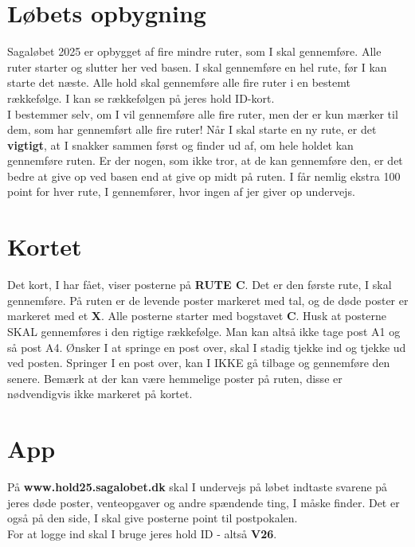 \section{Løbets opbygning}
Sagaløbet 2025 er opbygget af fire mindre ruter, som I skal gennemføre. Alle ruter starter og slutter her ved basen. I skal gennemføre en hel rute, før I kan starte det næste. Alle hold skal gennemføre alle fire ruter i en bestemt rækkefølge. I kan se rækkefølgen på jeres hold ID-kort.\\\newline
I bestemmer selv, om I vil gennemføre alle fire ruter, men der er kun mærker til dem, som har gennemført alle fire ruter! Når I skal starte en ny rute, er det \textbf{vigtigt}, at I snakker sammen først og finder ud af, om hele holdet kan gennemføre ruten. Er der nogen, som ikke tror, at de kan gennemføre den, er det bedre at give op ved basen end at give op midt på ruten. I får nemlig ekstra 100 point for hver rute, I gennemfører, hvor ingen af jer giver op undervejs.\\
\section{Kortet}
Det kort, I har fået, viser posterne på \textbf{RUTE C}. Det er den første rute, I skal gennemføre. På ruten er de levende poster markeret med tal, og de døde poster er markeret med et \textbf{X}. Alle posterne starter med bogstavet \textbf{C}. Husk at posterne SKAL gennemføres i den rigtige rækkefølge. Man kan altså ikke tage post A1 og så post A4. Ønsker I at springe en post over, skal I stadig tjekke ind og tjekke ud ved posten. Springer I en post over, kan I IKKE gå tilbage og gennemføre den senere. Bemærk at der kan være hemmelige poster på ruten, disse er nødvendigvis ikke markeret på kortet.
\section{App}
På \textbf{www.hold25.sagalobet.dk} skal I undervejs på løbet indtaste svarene på jeres døde poster, venteopgaver og andre spændende ting, I måske finder. Det er også på den side, I skal give posterne point til postpokalen.\\
For at logge ind skal I bruge jeres hold ID - altså \textbf{V26}.
\newpage
